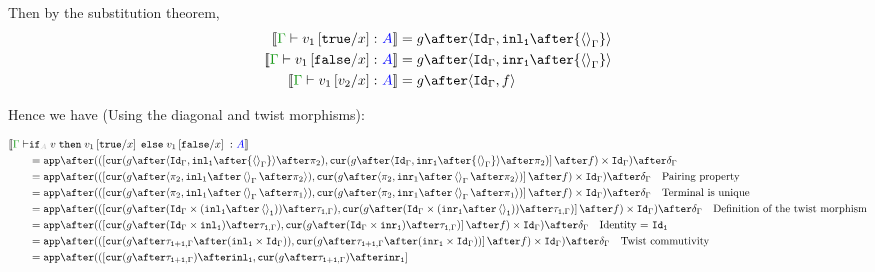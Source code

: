 \documentclass{report}
\begin{document}
    Then by the substitution theorem,
    \begin{align}
        \deno{\typerelation{\G}{v_1\ssub{x}{\t}}{ A}} & = g\after\pr{\idg}{\inl_\1\after{\term{\G}}}\\
        \deno{\typerelation{\G}{v_1\ssub{x}{\f}}{ A}} & = g\after\pr{\idg}{\inr_\1\after{\term{\G}}}\\
        \deno{\gtyperelation{v_1\ssub{x}{v_2}}{ A}} & = g\after\pr{\idg}{f}
    \end{align}

    Hence we have (Using the diagonal and twist morphisms):
 
    \begin{align}
        \deno{\gtyperelation{&\pifthenelse{A}{v}{v_1\ssub{x}{\t}}{v_1\ssub{x}{\f}}}{ A}}  \\ 
        & = \ifMorph{f}{g\after\pr{\idg}{\inl_\1\after{\term{\G}}}}{g\after\pr{\idg}{\inr_\1\after{\term{\G}}}}\\
        & = \app\after((\fld{
            \cur{g\after\pr{\pp}{\inl_1\after\term{\G}\after\pp}}
        }{
            \cur{g\after\pr{\pp}{\inr_1\after\term{\G}\after\pp}}
        }\after f)\times \idg)\after\diag{\G}\qt{Pairing property}\\
        &= \app\after((\fld{
            \cur{g\after\pr{\pp}{\inl_1\after\term{\G}\after\p}}
        }{
            \cur{g\after\pr{\pp}{\inr_1\after\term{\G}\after\p}}
        }\after f)\times \idg)\after\diag{\G}\qt{Terminal is unique}\\
        &= \app\after((\fld{
            \cur{g\after(\idg\times (\inl_\1\after\term{\1}))\after\twist{\1}{\G}}
        }{
            \cur{g\after(\idg\times (\inr_\1\after\term{\1}))\after\twist{\1}{\G}}
        }\after f)\times \idg)\after\diag{\G}\qt{Definition of the twist morphism}\\
        & = \app\after((\fld{
            \cur{g\after(\idg\times \inl_\1)\after\twist{\1}{\G}}
        }{
            \cur{g\after(\idg\times \inr_\1)\after\twist{\1}{\G}}
        }\after f)\times \idg)\after\diag{\G}\qt{Identity = $\Id{\1}$}\\
        & = \app\after((\fld{
            \cur{g\after\twist{\1+\1}{\G}\after(\inl_\1\times \idg)}
        }{
            \cur{g\after\twist{\1+\1}{\G}\after(\inr_\1\times \idg)}
        }\after f)\times \idg)\after\diag{\G}\qt{Twist commutivity}\\
        & = \app\after((\fld{
            \cur{g\after\twist{\1+\1}{\G}}\after\inl_\1
        }{
            \cur{g\after\twist{\1+\1}{\G}}\after\inr_\1
}
\end{align}
\end{document}
